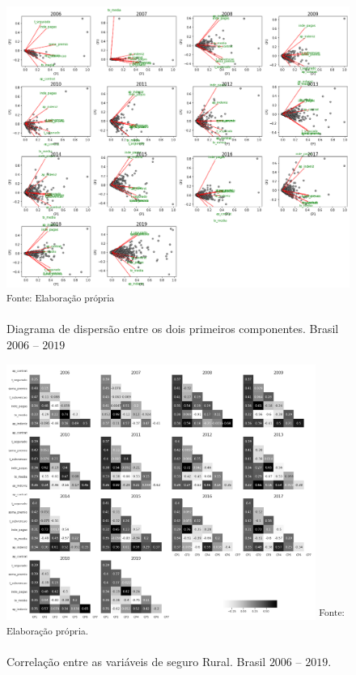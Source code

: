 \begin{figure}[H]
	\centering
	\caption{Diagrama de dispersão entre os dois primeiros componentes. Brasil $2006$ -- $2019$}
	\includegraphics[width=1\textwidth]{figuras/acp_biplot.png}
	\small \textsuperscript {Fonte: Elaboração própria}
    \label{acp_biplot}
\end{figure}

\begin{figure}[H]
	\centering
	\caption{Correlação entre as variáveis de seguro Rural. Brasil $2006$ -- $2019$.}
	\includegraphics[width=0.9\textwidth]{figuras/corr_pca_var.png}
	\small \textsuperscript {Fonte: Elaboração própria.}
    \label{corr_pca_var}
\end{figure}


